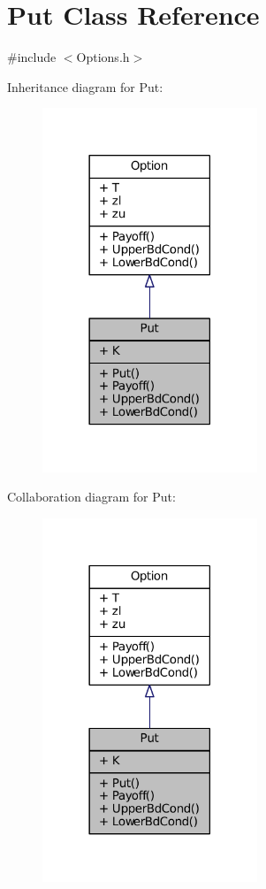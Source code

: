 \hypertarget{classPut}{\section{Put Class Reference}
\label{classPut}
}


{\ttfamily \#include $<$Options.\+h$>$}



Inheritance diagram for Put\+:\nopagebreak
\begin{figure}[H]
\begin{center}
\leavevmode
\includegraphics[width=182pt]{classPut__inherit__graph}
\end{center}
\end{figure}


Collaboration diagram for Put\+:\nopagebreak
\begin{figure}[H]
\begin{center}
\leavevmode
\includegraphics[width=182pt]{classPut__coll__graph}
\end{center}
\end{figure}
